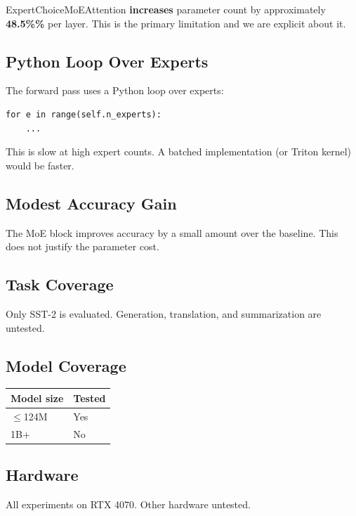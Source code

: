 ExpertChoiceMoEAttention \textbf{increases} parameter count by approximately 
\textbf{48.5\%\%} per layer. This is the primary limitation and we are 
explicit about it.

\subsection{Python Loop Over Experts}

The forward pass uses a Python loop over experts:

\begin{lstlisting}
for e in range(self.n_experts):
    ...
\end{lstlisting}

This is slow at high expert counts. A batched implementation (or Triton 
kernel) would be faster.

\subsection{Modest Accuracy Gain}

The MoE block improves accuracy by a small amount over the baseline. This 
does not justify the parameter cost.

\subsection{Task Coverage}

Only SST-2 is evaluated. Generation, translation, and summarization are 
untested.

\subsection{Model Coverage}

\begin{table}[H]
\centering
\small
\begin{tabular}{ll}
\toprule
\textbf{Model size} & \textbf{Tested} \\
\midrule
$\le$124M & Yes \\
1B+ & No \\
\bottomrule
\end{tabular}
\end{table}

\subsection{Hardware}

All experiments on RTX 4070. Other hardware untested.

